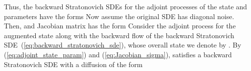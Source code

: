 \documentclass[twoside]{article}
\begin{document}
Thus, the backward Stratonovich SDEs for the adjoint processes of the state and parameters have the forms
Now assume the original SDE has diagonal noise. Then,  and Jacobian matrix  has the form
Consider the adjoint process for the augmented state along with the backward flow of the backward Stratonovich SDE~(\ref{eq:backward_stratonovich_sde}), whose overall state we denote by . 
By (\ref{eq:adjoint_state_param}) and (\ref{eq:Jacobian_sigma}),  satisfies a backward Stratonovich SDE with a diffusion of the form
\end{document}
